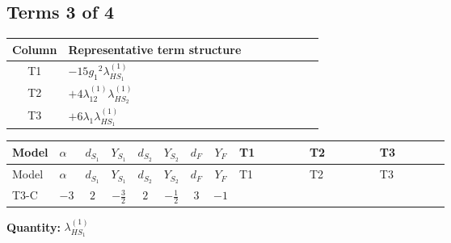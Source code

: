 \documentclass[8pt]{article}
\begin{document}
\begin{landscape}
\subsection*{Terms 3 of 4}
\begin{center}
\begin{tabular}{@{}c >{\raggedright\arraybackslash}p{0.82\linewidth}@{}}
\toprule
Column & Representative term structure \\
\midrule
T1 & \(\displaystyle -15 {g_1}^2 {\lambda_{HS_1}^{(1)}}\) \\
\midrule
T2 & \(\displaystyle +4 {\lambda_{12}^{(1)}} {\lambda_{HS_2}^{(1)}}\) \\
\midrule
T3 & \(\displaystyle +6 {\lambda_1} {\lambda_{HS_1}^{(1)}}\) \\
\midrule
\bottomrule
\end{tabular}
\end{center}
\smallskip
\tiny
\begin{longtable}{@{}llcccccc >{\raggedright\arraybackslash}p{0.21\linewidth} >{\raggedright\arraybackslash}p{0.21\linewidth} >{\raggedright\arraybackslash}p{0.21\linewidth}@{}}
\toprule
Model & $\alpha$ & $d_{S_1}$ & $Y_{S_1}$ & $d_{S_2}$ & $Y_{S_2}$ & $d_F$ & $Y_F$ & T1 & T2 & T3 \\
\midrule
\endfirsthead
\toprule
Model & $\alpha$ & $d_{S_1}$ & $Y_{S_1}$ & $d_{S_2}$ & $Y_{S_2}$ & $d_F$ & $Y_F$ & T1 & T2 & T3 \\
\midrule
\endhead
T3-C & $-3$ & $2$ & $-\frac{3}{2}$ & $2$ & $-\frac{1}{2}$ & $3$ & $-1$ & \scriptsize\adjustbox{max width=\linewidth}{$\begin{gathered} -15 {g_1}^2 {\lambda_{HS_1}^{(1)}}\end{gathered}$} & \scriptsize\adjustbox{max width=\linewidth}{$\begin{gathered} +4 {\lambda_{12}^{(1)}} {\lambda_{HS_2}^{(1)}}\end{gathered}$} & \scriptsize\adjustbox{max width=\linewidth}{$\begin{gathered} +6 {\lambda_1} {\lambda_{HS_1}^{(1)}}\end{gathered}$} \\
\midrule
\bottomrule
\end{longtable}
\clearpage
\noindent\textbf{Quantity: }$\lambda_{HS_1}^{(1)}$\par\smallskip

\end{landscape}
\end{document}
